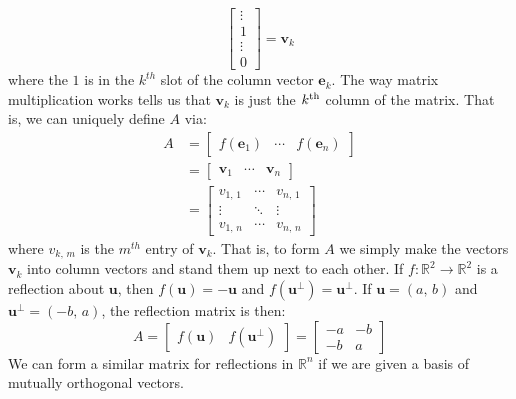\documentclass{article}
\theoremstyle{normal}
\newenvironment{example}{%
    \pushQED{\qed}\renewcommand{\qedsymbol}{$\blacksquare$}\examplex%
}{%
    \popQED\endexamplex%
}
\begin{document}
\begin{example}[\textbf{Reflection Matrix}]
\begin{equation}
\begin{bmatrix}
                \vdots\\
                1\\
                \vdots\\
                0
            \end{bmatrix}
            =\mathbf{v}_{k}
        \end{equation}
        where the $1$ is in the $k^{th}$ slot of the column vector
        $\mathbf{e}_{k}$. The way matrix multiplication works tells us that
        $\mathbf{v}_{k}$ is just the $k^{\small\textrm{th}}$
        column of the matrix. That is, we can uniquely define $A$ via:
        \begin{align}
            A&=
            \begin{bmatrix}
                f(\mathbf{e}_{1})&\cdots&f(\mathbf{e}_{n})
            \end{bmatrix}\\
            &=
            \begin{bmatrix}
                \mathbf{v}_{1}&\cdots&\mathbf{v}_{n}
            \end{bmatrix}\\
            &=
            \begin{bmatrix}
                v_{1,\,1}&\cdots&v_{n,\,1}\\
                \vdots&\ddots&\vdots\\
                v_{1,\,n}&\cdots&v_{n,\,n}
            \end{bmatrix}
        \end{align}
        where $v_{k,\,m}$ is the $m^{th}$ entry of $\mathbf{v}_{k}$. That is,
        to form $A$ we simply make the vectors $\mathbf{v}_{k}$ into column
        vectors and stand them up next to each other. If
        $f:\mathbb{R}^{2}\rightarrow\mathbb{R}^{2}$ is a reflection about
        $\mathbf{u}$, then $f(\mathbf{u})=-\mathbf{u}$ and
        $f(\mathbf{u}^{\perp})=\mathbf{u}^{\perp}$. If
        $\mathbf{u}=(a,\,b)$ and $\mathbf{u}^{\perp}=(-b,\,a)$, the reflection
        matrix is then:
        \begin{equation}
            A=
            \begin{bmatrix}
                f(\mathbf{u})&f(\mathbf{u}^{\perp})
            \end{bmatrix}
            =
            \begin{bmatrix}
                -a&-b\\
                -b&a
            \end{bmatrix}
        \end{equation}
        We can form a similar matrix for reflections in $\mathbb{R}^{n}$ if we
        are given a basis of mutually orthogonal vectors.
    \end{example}
\end{document}
